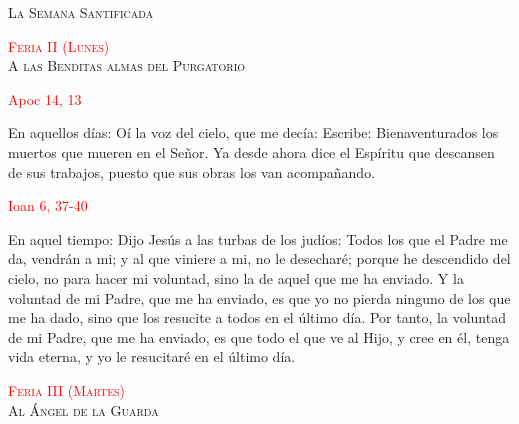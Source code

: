 \documentclass[10pt]{article}
\begin{document}
\begin{center}
      \textsc{\Large La Semana Santificada}
\end{center}

\begin{multicols}{2}

      \begin{center}
            \textsc{\textcolor{red}{Feria II (Lunes)}\\ {\large A las Benditas almas del Purgatorio}}
      \end{center}

      \hfill\textcolor{red}{Apoc 14, 13}

      En aquellos días: Oí la voz del cielo, que me decía: Escribe: Bienaventurados los muertos que mueren en el Señor. Ya desde ahora dice el Espíritu que descansen
      de sus trabajos, puesto que sus obras los van acompañando.\newline
      
      \hfill\textcolor{red}{Ioan 6, 37-40}

      En aquel tiempo: Dijo Jesús a las turbas de los judíos: Todos los que el Padre me da, vendrán a mi; y al que viniere a mi, no le desecharé; porque he descendido
      del cielo, no para hacer mi voluntad, sino la de aquel que me ha enviado. Y la voluntad de mi Padre, que me ha enviado, es que yo no pierda ninguno de los que
      me ha dado, sino que los resucite a todos en el último día. Por tanto, la voluntad de mi Padre, que me ha enviado, es que todo el que ve al Hijo, y cree en él,
      tenga vida eterna, y yo le resucitaré en el último día.\newline
      
      \begin{otherlanguage}{latin}
            

            

            

            

            
      \end{otherlanguage}

      \begin{center}
            \textsc{\textcolor{red}{Feria III (Martes)}\\ {\large Al Ángel de la Guarda}}
      \end{center}


\end{multicols}
\end{document}
